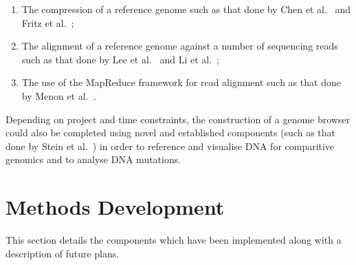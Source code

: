 \documentclass{csfyp}
\begin{document}
\begin{enumerate}[nolistsep]

   \item The compression of a reference genome such as that done by Chen et al.~\cite{gencompress} and Fritz et al.~\cite{refcompression};

  \item The alignment of a reference genome against a number of sequencing reads such as that done by Lee et al.~\cite{cgreads} and Li et al.~\cite{bwtransform};

  \item The use of the MapReduce framework for read alignment such as that done by Menon et al.~\cite{mapredgen}.

\end{enumerate}

Depending on project and time constraints, the construction of a genome browser could also be completed using novel and established components (such as that done by Stein et al.~\cite{genericbrowser}) in order to reference and visualise DNA for comparitive genomics and to analyse DNA mutations.


\section{Methods Development}\vspace{-2ex}

This section details the components which have been implemented along with a description of future plans.
\end{document}
